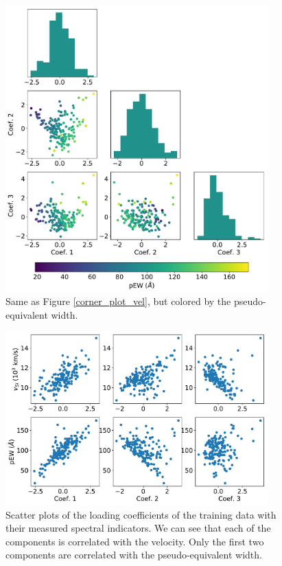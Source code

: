 \begin{figure}[htbp]
    \centering
    \includegraphics[width=0.9\textwidth]{figures/si_feat_pca/corner_plot_ew.pdf}
    \caption{Same as Figure \ref{corner_plot_vel}, but colored by the pseudo-equivalent width.}
    \label{corner_plot_ew}
\end{figure}

\begin{figure}[htbp]
    \centering
    \includegraphics[width=0.9\textwidth]{figures/si_feat_pca/coef_vs_vel_and_ew.pdf}
    \caption{Scatter plots of the loading coefficients of the training data with their measured spectral indicators. We can see that each of the components is correlated with the velocity. Only the first two components are correlated with the pseudo-equivalent width.}
    \label{scatter_loading}
\end{figure}

